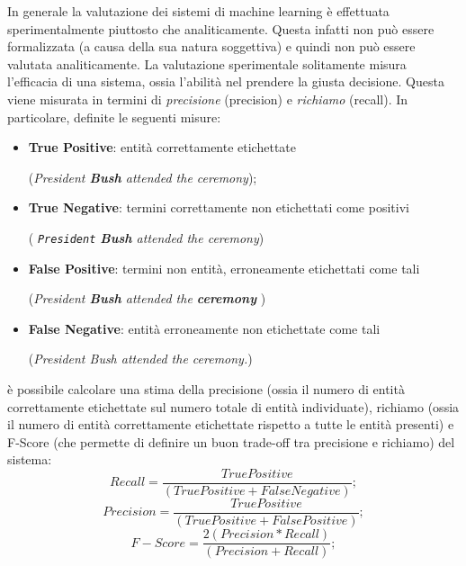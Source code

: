 In generale la valutazione dei sistemi di machine learning è effettuata sperimentalmente piuttosto che analiticamente. Questa infatti non può essere formalizzata (a causa della sua natura soggettiva) e quindi non può essere valutata analiticamente.
La valutazione sperimentale solitamente misura l'efficacia di una sistema, ossia l'abilità nel prendere la giusta decisione. Questa viene
misurata in termini di \textit{precisione} (precision) e  \textit{richiamo} (recall).
In particolare, definite le seguenti misure:
\begin{itemize}
	\item \textbf{True Positive}: entità correttamente etichettate 
	
	
	(\textit{President \textbf{Bush} attended the ceremony});
	\item \textbf{True Negative}: termini correttamente non etichettati come positivi 
	
	(\textit{ \texttt{President} \textbf{Bush} attended the ceremony})
	\item \textbf{False Positive}: termini non entità, erroneamente etichettati come tali
	
	(\textit{President \textbf{Bush} attended the \textbf{ceremony} })
	\item \textbf{False Negative}: entità erroneamente non etichettate come tali
	
	(\textit{President Bush attended the ceremony.})
\end{itemize}
è possibile calcolare una stima della precisione (ossia il numero di entità correttamente etichettate sul numero totale di entità individuate), richiamo (ossia il numero di entità correttamente etichettate rispetto a tutte le entità presenti) e F-Score (che permette di definire un buon trade-off tra precisione e richiamo) del sistema:
\begin{equation}
\label{recall}
Recall= \frac{True Positive}{(True Positive + False Negative)};
\end{equation}
\begin{equation}
\label{precision}
Precision= \frac{True Positive}{(True Positive + False Positive)};
\end{equation}
\begin{equation}
\label{Fscore}
F-Score= \frac{2(Precision * Recall)}{(Precision + Recall)};
\end{equation}

